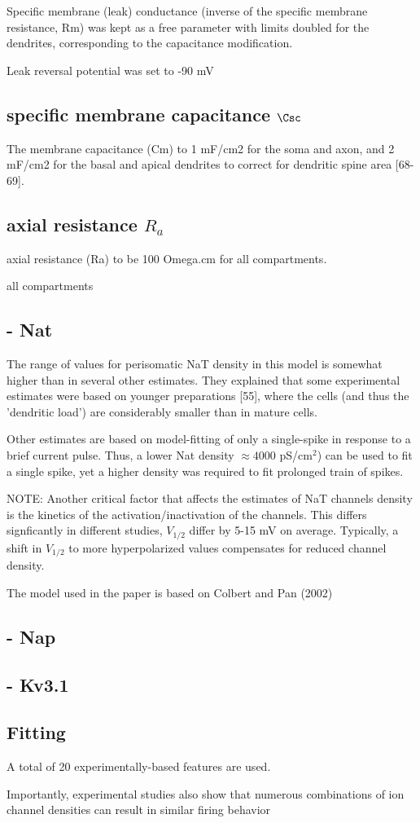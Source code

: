 Specific membrane (leak) conductance (inverse of the specific
membrane resistance, Rm) was kept as a free parameter with limits
doubled for the dendrites, corresponding to the capacitance
modification.

Leak reversal potential was set to -90 mV

\subsection{specific membrane capacitance $\Csc$}

The membrane capacitance (Cm) to 1 mF/cm2 for the soma and axon, and 2 mF/cm2
for the basal and apical dendrites to correct for dendritic spine area [68-69].

\subsection{axial resistance $R_a$}

axial resistance (Ra) to be 100 Omega.cm for all compartments.


all compartments 

\subsection{- Nat}

The range of values for perisomatic NaT density in this model is somewhat higher
than in several other estimates. They explained that some experimental estimates
were based on younger preparations [55], where the cells (and thus the
'dendritic load') are considerably smaller than in mature cells.

Other estimates are based on model-fitting of only a single-spike in response to
a brief current pulse. Thus, a lower Nat density $\approx 4000$ pS/cm$^2$) can
be used to fit a single spike, yet a higher density was required to fit
prolonged train of spikes.

NOTE: Another critical factor that affects the estimates of NaT channels density
is the kinetics of the activation/inactivation of the channels. This differs
signficantly in different studies, $V_{1/2}$ differ by 5-15 mV on average.
Typically, a shift in $V_{1/2}$ to more hyperpolarized values compensates for
reduced channel density.

The model used in the paper is based on Colbert and Pan (2002)


\subsection{- Nap}

\subsection{- Kv3.1}



\subsection{Fitting}

A total of 20 experimentally-based features are used.

Importantly, experimental studies also show that numerous combinations of ion
channel densities can result in similar firing behavior

